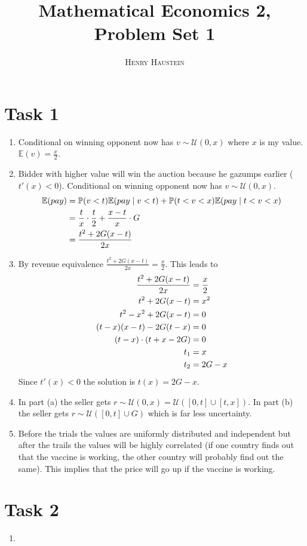 \documentclass{article}
\title{\textbf{Mathematical Economics 2, Problem Set 1}}
\author{\textsc{Henry Haustein}}
\date{}
\newcommand{\E}{\mathbb{E}}
\begin{document}
	\maketitle
	
	\section*{Task 1}
	\begin{enumerate}[label=(\alph*)]
		\item Conditional on winning opponent now has $v\sim\mathcal{U}(0,x)$ where $x$ is my value. $\E(v) = \frac{x}{2}$.
		\item Bidder with higher value will win the auction because he gazumps earlier ($t'(x) < 0$). Conditional on winning opponent now has $v\sim\mathcal{U}(0,x)$.
		\begin{align}
			\E(pay) &= \mathbb{P}(v<t)\E(pay\mid v<t) + \mathbb{P}(t < v < x)\E(pay\mid t<v<x) \notag \\
			&= \frac{t}{x}\cdot\frac{t}{2} + \frac{x-t}{x}\cdot G \notag \\
			&= \frac{t^2 + 2G(x-t)}{2x} \notag
		\end{align}
		\item By revenue equivalence $\frac{t^2 + 2G(x-t)}{2x} = \frac{x}{2}$. This leads to
		\begin{align}
			\frac{t^2 + 2G(x-t)}{2x} &= \frac{x}{2} \notag \\
			t^2 + 2G(x-t) &= x^2 \notag \\
			t^2 - x^2 + 2G(x-t) &= 0 \notag \\
			(t-x)(x-t) - 2G(t-x) &= 0 \notag \\
			(t-x)\cdot (t+x-2G) &= 0 \notag \\
			t_1 &= x \notag \\
			t_2 &= 2G-x \notag
		\end{align}
		Since $t'(x) < 0$ the solution is $t(x) = 2G-x$.
		\item In part (a) the seller gets $r\sim\mathcal{U}(0,x) = \mathcal{U}([0,t] \cup [t,x])$. In part (b) the seller gets $r\sim\mathcal{U}([0,t] \cup G)$ which is far less uncertainty.
		\item Before the trials the values are uniformly distributed and independent but after the trails the values will be highly correlated (if one country finds out that the vaccine is working, the other country will probably find out the same). This implies that the price will go up if the vaccine is working.
	\end{enumerate}

	\section*{Task 2}
	\begin{enumerate}[label=(\alph*)]
		\item 
	\end{enumerate}
\end{document}
